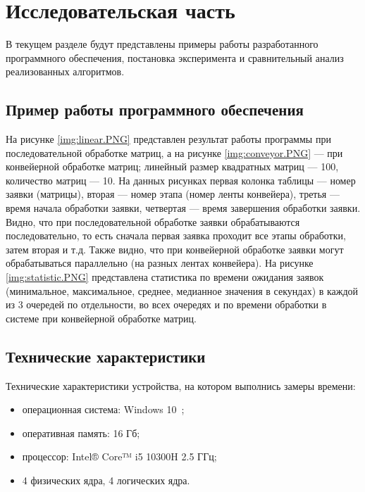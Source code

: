 \chapter{Исследовательская часть}
В текущем разделе будут представлены примеры работы разработанного программного обеспечения, постановка эксперимента и сравнительный анализ реализованных алгоритмов.

\section{Пример работы программного обеспечения}

На рисунке \ref{img:linear.PNG} представлен результат работы программы при последовательной обработке матриц, а на рисунке \ref{img:conveyor.PNG} --- при конвейерной обработке матриц; линейный размер квадратных матриц --- 100, количество матриц --- 10. На данных рисунках первая колонка таблицы --- номер заявки (матрицы), вторая --- номер этапа (номер ленты конвейера), третья --- время начала обработки заявки, четвертая --- время завершения обработки заявки.
Видно, что при последовательной обработке заявки обрабатываются последовательно, то есть сначала первая заявка проходит все этапы обработки, затем вторая и т.д. Также видно, что при конвейерной обработке заявки могут обрабатываться параллельно (на разных лентах конвейера). На рисунке \ref{img:statistic.PNG} представлена статистика по времени ожидания заявок (минимальное, максимальное, среднее, медианное значения в секундах) в каждой из 3 очередей по отдельности, во всех очередях и по времени обработки в системе при конвейерной обработке матриц.

\clearpage

\section{Технические характеристики}

Технические характеристики устройства, на котором выполнись замеры времени:

\begin{itemize}
	\item операционная система: Windows 10~\cite{windows10};
	\item оперативная память: 16 Гб;
	\item процессор: Intel® Core™ i5 10300H 2.5 ГГц;
	\item 4 физических ядра, 4 логических ядра.
\end{itemize}

